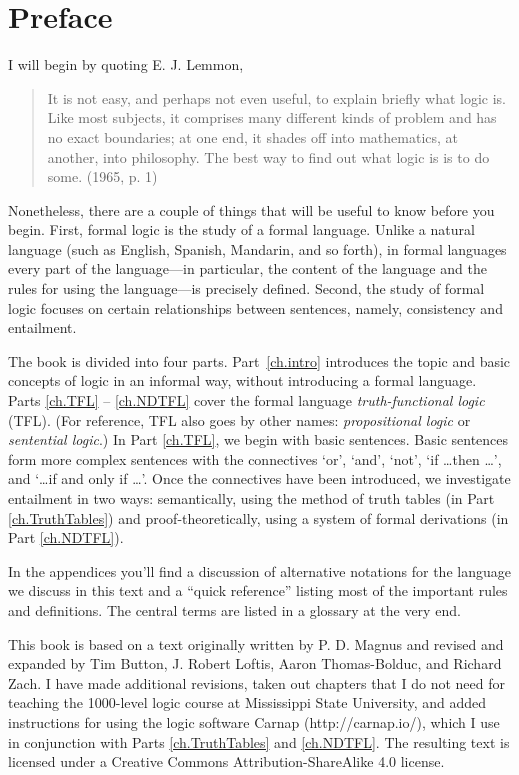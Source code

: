 \chapter{Preface}

I will begin by quoting E. J. Lemmon,
\begin{quote}
It is not easy, and perhaps not even useful, to explain briefly what logic is. Like most subjects, it comprises many different kinds of problem and has no exact boundaries; at one end, it shades off into mathematics, at another, into philosophy. The best way to find out what logic is is to do some. (1965, p. 1)
\end{quote}
Nonetheless, there are a couple of things that will be useful to know before you begin. First, formal logic is the study of a formal language. Unlike a natural language (such as English, Spanish, Mandarin, and so forth), in formal languages every part of the language—in particular, the content of the language and the rules for using the language—is precisely defined. Second, the study of formal logic focuses on certain relationships between sentences, namely, consistency and entailment.  

The book is divided into four parts. Part~\ref{ch.intro} introduces the topic and basic concepts of logic in an informal way, without introducing a formal language. Parts \ref{ch.TFL} -- \ref{ch.NDTFL} cover the formal language \textit{truth-functional logic} (TFL). (For reference, TFL also goes by other names: \textit{propositional logic} or \textit{sentential logic}.) In Part \ref{ch.TFL}, we begin with basic sentences. Basic sentences form more complex sentences with the connectives ‘or’, ‘and’, ‘not’, ‘if \ldots then \ldots’, and `\ldots if and only if \ldots'. Once the connectives have been introduced, we investigate entailment in two ways: semantically, using the method of truth tables (in Part \ref{ch.TruthTables}) and proof-theoretically, using a system of formal derivations (in Part \ref{ch.NDTFL}). 

In the appendices you’ll find a discussion of alternative notations for the language we discuss in this text and a ``quick reference'' listing most of the important rules and definitions. The central terms are listed in a glossary at the very end.

This book is based on a text originally written by P. D. Magnus and revised and expanded by Tim Button, J. Robert Loftis, Aaron Thomas-Bolduc, and Richard Zach. I have made additional revisions, taken out chapters that I do not need for teaching the 1000-level logic course at Mississippi State University, and added instructions for using the logic software Carnap (http://carnap.io/), which I use in conjunction with Parts \ref{ch.TruthTables} and \ref{ch.NDTFL}. The resulting text is licensed under a Creative Commons Attribution-ShareAlike 4.0 license.

